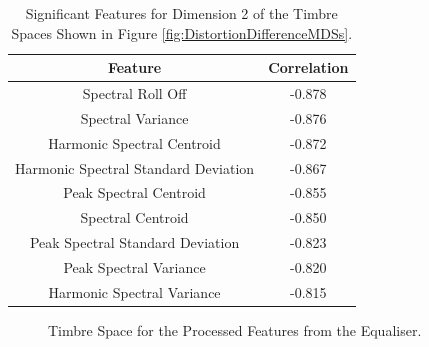 		\begin{table}[h!]
			\centering
			\begin{tabular}{|c|c|}
				\hline
				\bf{Feature} & \bf{Correlation} \\
				\hline
				\hline
				Spectral Roll Off & -0.878 \\
				\hline
				Spectral Variance & -0.876 \\
				\hline
				Harmonic Spectral Centroid & -0.872 \\
				\hline
				Harmonic Spectral Standard Deviation & -0.867 \\
				\hline
				Peak Spectral Centroid & -0.855 \\
				\hline
				Spectral Centroid & -0.850 \\
				\hline
				Peak Spectral Standard Deviation & -0.823 \\
				\hline
				Peak Spectral Variance & -0.820 \\
				\hline
				Harmonic Spectral Variance & -0.815 \\
				\hline
			\end{tabular}
			\caption{Significant Features for Dimension 2 of the Timbre Spaces Shown in Figure 
				 \ref{fig:DistortionDifferenceMDSs}.}
			\label{tab:DistortionDifferenceFeatures}
		\end{table}

		\begin{figure}[h!]
			\centering
			\qquad
			\caption{Timbre Space for the Processed Features from the Equaliser.}
			\label{fig:EqualiserProcessedMDSs}
		\end{figure}

